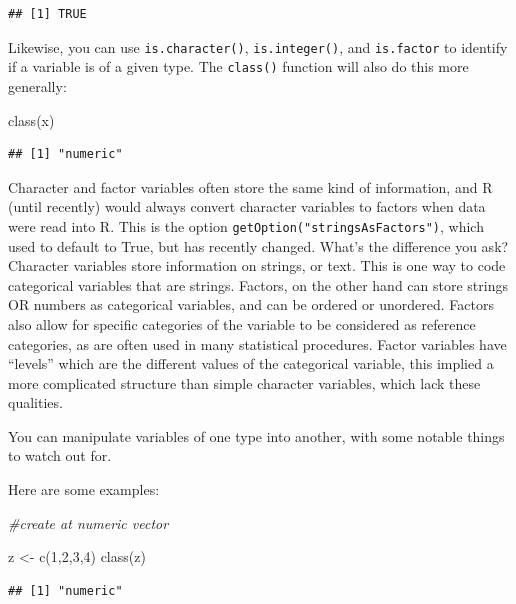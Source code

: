 \documentclass[
]{article}
\newenvironment{Shaded}{\begin{snugshade}}{\end{snugshade}}
\newcommand{\CommentTok}[1]{\textcolor[rgb]{0.56,0.35,0.01}{\textit{#1}}}
\newcommand{\DecValTok}[1]{\textcolor[rgb]{0.00,0.00,0.81}{#1}}
\newcommand{\FunctionTok}[1]{\textcolor[rgb]{0.00,0.00,0.00}{#1}}
\newcommand{\NormalTok}[1]{#1}
\newcommand{\OtherTok}[1]{\textcolor[rgb]{0.56,0.35,0.01}{#1}}
\begin{document}
\begin{verbatim}
## [1] TRUE
\end{verbatim}

Likewise, you can use \texttt{is.character()}, \texttt{is.integer()}, and \texttt{is.factor}
to identify if a variable is of a given type. The \texttt{class()} function
will also do this more generally:

\begin{Shaded}
\begin{Highlighting}[]
\FunctionTok{class}\NormalTok{(x)}
\end{Highlighting}
\end{Shaded}

\begin{verbatim}
## [1] "numeric"
\end{verbatim}

Character and factor variables often store the same kind of information,
and R (until recently) would always convert character variables to
factors when data were read into R. This is the option
\texttt{getOption("stringsAsFactors")}, which used to default to True, but has
recently changed. What's the difference you ask? Character variables
store information on strings, or text. This is one way to code
categorical variables that are strings. Factors, on the other hand can
store strings OR numbers as categorical variables, and can be ordered or
unordered. Factors also allow for specific categories of the variable to
be considered as reference categories, as are often used in many
statistical procedures. Factor variables have ``levels'' which are the
different values of the categorical variable, this implied a more
complicated structure than simple character variables, which lack these
qualities.

You can manipulate variables of one type into another, with some notable
things to watch out for.

Here are some examples:

\begin{Shaded}
\begin{Highlighting}[]
\CommentTok{\#create at numeric vector}

\NormalTok{z }\OtherTok{\textless{}{-}}  \FunctionTok{c}\NormalTok{(}\DecValTok{1}\NormalTok{,}\DecValTok{2}\NormalTok{,}\DecValTok{3}\NormalTok{,}\DecValTok{4}\NormalTok{)}
\FunctionTok{class}\NormalTok{(z)}
\end{Highlighting}
\end{Shaded}

\begin{verbatim}
## [1] "numeric"
\end{verbatim}
\end{document}
